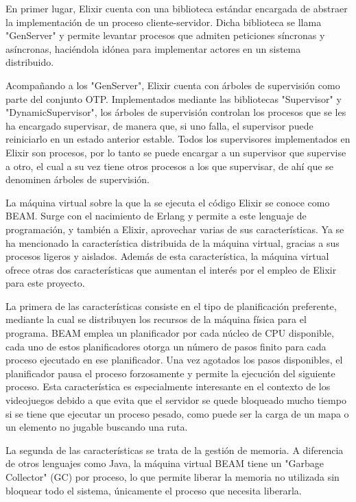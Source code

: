 En primer lugar, Elixir cuenta con una biblioteca estándar encargada de abstraer la implementación de un proceso cliente-servidor. Dicha biblioteca se llama "GenServer" y permite levantar procesos que admiten peticiones síncronas y asíncronas, haciéndola idónea para implementar actores en un sistema distribuido.

Acompañando a los "GenServer", Elixir cuenta con árboles de supervisión como parte del conjunto OTP. Implementados mediante las bibliotecas "Supervisor" y "DynamicSupervisor", los árboles de supervisión controlan los procesos que se les ha encargado supervisar, de manera que, si uno falla, el supervisor puede reiniciarlo en un estado anterior estable. Todos los supervisores implementados en Elixir son procesos, por lo tanto se puede encargar a un supervisor que supervise a otro, el cual a su vez tiene otros procesos a los que supervisar, de ahí que se denominen árboles de supervisión.

La máquina virtual sobre la que la se ejecuta el código Elixir se conoce como BEAM. Surge con el nacimiento de Erlang y permite a este lenguaje de programación, y también a Elixir, aprovechar varias de sus características. Ya se ha mencionado la característica distribuida de la máquina virtual, gracias a sus procesos ligeros y aislados. Además de esta característica, la máquina virtual ofrece otras dos características que aumentan el interés por el empleo de Elixir para este proyecto.

La primera de las características consiste en el tipo de planificación preferente, mediante la cual se distribuyen los recursos de la máquina física para el programa. BEAM emplea un planificador por cada núcleo de CPU disponible, cada uno de estos planificadores otorga un número de pasos finito para cada proceso ejecutado en ese planificador. Una vez agotados los pasos disponibles, el planificador pausa el proceso forzosamente y permite la ejecución del siguiente proceso. Esta característica es especialmente interesante en el contexto de los videojuegos debido a que evita que el servidor se quede bloqueado mucho tiempo si se tiene que ejecutar un proceso pesado, como puede ser la carga de un mapa o un elemento no jugable buscando una ruta.

La segunda de las características se trata de la gestión de memoria. A diferencia de otros lenguajes como Java, la máquina virtual BEAM tiene un "Garbage Collector" (GC) por proceso, lo que permite liberar la memoria no utilizada sin bloquear todo el sistema, únicamente el proceso que necesita liberarla.

